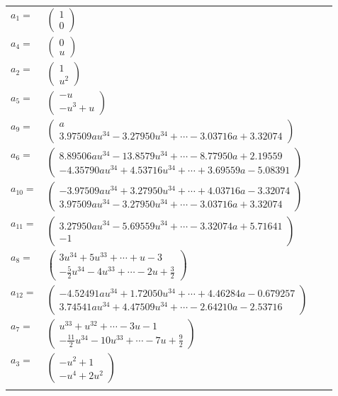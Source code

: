 \documentclass[1p]{elsarticle_modified}
\theoremstyle{definition}
\begin{document}
\begin{tabular}{m{7pt} m{180pt} m{7pt} m{180pt} }
\flushright $a_{1}=$&$\begin{pmatrix}1\\0\end{pmatrix}$ \\
\flushright $a_{4}=$&$\begin{pmatrix}0\\u\end{pmatrix}$ \\
\flushright $a_{2}=$&$\begin{pmatrix}1\\u^2\end{pmatrix}$ \\
\flushright $a_{5}=$&$\begin{pmatrix}- u\\- u^3+u\end{pmatrix}$ \\
\flushright $a_{9}=$&$\begin{pmatrix}a\\3.97509 a u^{34}-3.27950 u^{34}+\cdots-3.03716 a+3.32074\end{pmatrix}$ \\
\flushright $a_{6}=$&$\begin{pmatrix}8.89506 a u^{34}-13.8579 u^{34}+\cdots-8.77950 a+2.19559\\-4.35790 a u^{34}+4.53716 u^{34}+\cdots+3.69559 a-5.08391\end{pmatrix}$ \\
\flushright $a_{10}=$&$\begin{pmatrix}-3.97509 a u^{34}+3.27950 u^{34}+\cdots+4.03716 a-3.32074\\3.97509 a u^{34}-3.27950 u^{34}+\cdots-3.03716 a+3.32074\end{pmatrix}$ \\
\flushright $a_{11}=$&$\begin{pmatrix}3.27950 a u^{34}-5.69559 u^{34}+\cdots-3.32074 a+5.71641\\-1\end{pmatrix}$ \\
\flushright $a_{8}=$&$\begin{pmatrix}3 u^{34}+5 u^{33}+\cdots+u-3\\-\frac{5}{2} u^{34}-4 u^{33}+\cdots-2 u+\frac{3}{2}\end{pmatrix}$ \\
\flushright $a_{12}=$&$\begin{pmatrix}-4.52491 a u^{34}+1.72050 u^{34}+\cdots+4.46284 a-0.679257\\3.74541 a u^{34}+4.47509 u^{34}+\cdots-2.64210 a-2.53716\end{pmatrix}$ \\
\flushright $a_{7}=$&$\begin{pmatrix}u^{33}+u^{32}+\cdots-3 u-1\\-\frac{11}{2} u^{34}-10 u^{33}+\cdots-7 u+\frac{9}{2}\end{pmatrix}$ \\
\flushright $a_{3}=$&$\begin{pmatrix}- u^2+1\\- u^4+2 u^2\end{pmatrix}$\\&\end{tabular}
\end{document}
